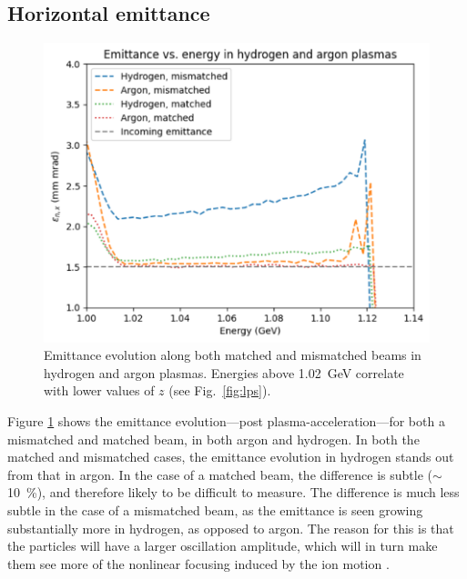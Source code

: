 \documentclass[a4paper,
               biblatex,     %
               ]{jacow}
\begin{document}
\subsection{Horizontal emittance}
\label{section:horizontal_emittance}
\begin{figure}[!tbh]
    \centering
    \includegraphics[width=0.9\linewidth]{TUPS013_f3.pdf}
    \caption{Emittance evolution along both matched and mismatched beams in hydrogen and argon plasmas. Energies above \SI{1.02}{GeV} correlate with lower values of $z$ (see Fig.~\ref{fig:lps}).}
    \label{fig:emittances}
\end{figure}
Figure \ref{fig:emittances} shows the emittance evolution---post plasma-acceleration---for both a mismatched and matched beam, in both argon and hydrogen. In both the matched and mismatched cases, the emittance evolution in hydrogen stands out from that in argon. In the case of a matched beam, the difference is subtle ($\sim$\SI{10}{\%}), and therefore likely to be difficult to measure. The difference is much less subtle in the case of a mismatched beam, as the emittance is seen growing substantially more in hydrogen, as opposed to argon. The reason for this is that the particles will have a larger oscillation amplitude, which will in turn make them see more of the nonlinear focusing induced by the ion motion \cite{Benedetti, An}.
\end{document}
